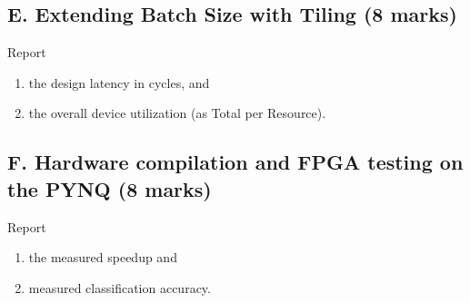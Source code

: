 \subsection{E. Extending Batch Size with Tiling (8 marks)}

Report \begin{enumerate}
    \item the design latency in cycles, and
    \item the overall device utilization (as Total per Resource).
\end{enumerate}

\subsection{F. Hardware compilation and FPGA testing on the PYNQ (8 marks)}

Report
\begin{enumerate}
    \item the measured speedup and
    \item measured classification accuracy.
\end{enumerate}

